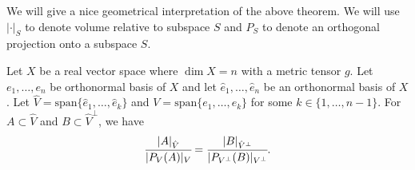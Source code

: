 \documentclass[main.tex]{subfiles}
\begin{document}
We will give a nice geometrical interpretation of the above theorem. We will use $|\cdot|_S$ to denote volume relative to subspace $S$ and $P_S$ to denote an orthogonal projection onto a subspace $S$.
\begin{theorem}
Let $X$ be a real vector space where $\dim X = n$ with a metric tensor $g$. Let $e_1, \dots, e_n$ be orthonormal basis of $X$ and let $\hat{e}_1, \dots, \hat{e}_n$ be an orthonormal basis of $X$. 
Let $\hat{V} = \text{span}\{\hat{e}_1, \dots, \hat{e}_k\}$ and 
$V = \text{span}\{e_1, \dots, e_k\}$ for some $k\in \{1, \dots, n - 1\}$. For $A\subset \hat{V}$ 
and $B\subset \hat{V}^\perp$, we have
\begin{equation}
\cfrac{|A|_{\hat{V}}}{|P_V(A)|_V} 
= 
\cfrac{|B|_{\hat{V}^\perp}}{|P_{V^\perp}(B)|_{V^\perp}}. 
\end{equation}

\end{theorem}
\end{document}
